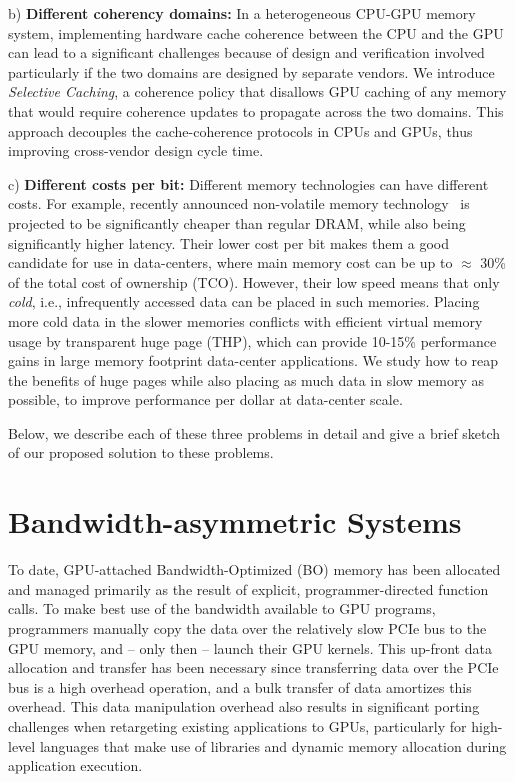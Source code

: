 b) \textbf{Different coherency domains:} 
In a heterogeneous CPU-GPU memory system, implementing hardware cache coherence
between the CPU and the GPU can lead to a significant challenges because of
design and verification involved particularly if the two domains are designed by
separate vendors. We introduce {\it Selective Caching}, a coherence policy that
disallows GPU caching of any memory that would require coherence updates to
propagate across the two domains. This approach decouples the cache-coherence
protocols in CPUs and GPUs, thus improving cross-vendor design cycle time.

c) \textbf{Different costs per bit:}
Different memory technologies can have different costs.  For example, recently
announced non-volatile memory technology~\cite{xpoint} is projected to be
significantly cheaper than regular DRAM, while also being significantly higher
latency. Their lower cost per bit makes them a good candidate for use in
data-centers, where main memory cost can be up to $\approx$ 30\% of the total
cost of ownership (TCO). However, their low speed means that only {\it cold},
i.e., infrequently accessed data can be placed in such memories.  Placing more
cold data in the slower memories conflicts with efficient virtual memory usage
by transparent huge page (THP), which can provide 10-15\% performance gains in
large memory footprint data-center applications. We study how to reap the
benefits of huge pages while also placing as much data in slow memory as
possible, to improve performance per dollar at data-center scale.

Below, we describe each of these three problems in detail and give a brief
sketch of our proposed solution to these problems.

\section{Bandwidth-asymmetric Systems}
To date, GPU-attached Bandwidth-Optimized (BO) memory has been allocated and
managed primarily as the result of explicit, programmer-directed function calls.
To make best use of the bandwidth available to GPU programs, programmers
manually copy the data over the relatively slow PCIe bus to the GPU memory, and
-- only then -- launch their GPU kernels.  This up-front data allocation and
transfer has been necessary since transferring data over the PCIe bus is a high
overhead operation, and a bulk transfer of data amortizes this overhead. This
data manipulation overhead also results in significant porting challenges when
retargeting existing applications to GPUs, particularly for high-level languages
that make use of libraries and dynamic memory allocation during application
execution.

